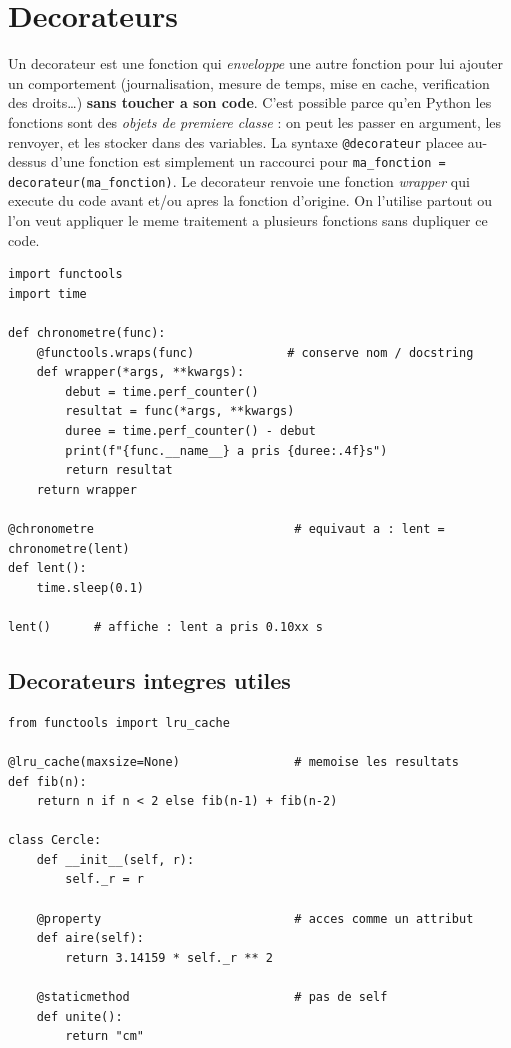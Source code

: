 \documentclass[11pt,a4paper]{article}
\begin{document}
\section{Decorateurs}
Un decorateur est une fonction qui \emph{enveloppe} une autre fonction pour lui
ajouter un comportement (journalisation, mesure de temps, mise en cache,
verification des droits\ldots) \textbf{sans toucher a son code}. C'est possible
parce qu'en Python les fonctions sont des \emph{objets de premiere classe} : on
peut les passer en argument, les renvoyer, et les stocker dans des variables. La
syntaxe \texttt{@decorateur} placee au-dessus d'une fonction est simplement un
raccourci pour \texttt{ma\_fonction = decorateur(ma\_fonction)}. Le decorateur
renvoie une fonction \emph{wrapper} qui execute du code avant et/ou apres la
fonction d'origine. On l'utilise partout ou l'on veut appliquer le meme
traitement a plusieurs fonctions sans dupliquer ce code.

\begin{lstlisting}
import functools
import time

def chronometre(func):
    @functools.wraps(func)             # conserve nom / docstring
    def wrapper(*args, **kwargs):
        debut = time.perf_counter()
        resultat = func(*args, **kwargs)
        duree = time.perf_counter() - debut
        print(f"{func.__name__} a pris {duree:.4f}s")
        return resultat
    return wrapper

@chronometre                            # equivaut a : lent = chronometre(lent)
def lent():
    time.sleep(0.1)

lent()      # affiche : lent a pris 0.10xx s
\end{lstlisting}

\subsection{Decorateurs integres utiles}
\begin{lstlisting}
from functools import lru_cache

@lru_cache(maxsize=None)                # memoise les resultats
def fib(n):
    return n if n < 2 else fib(n-1) + fib(n-2)

class Cercle:
    def __init__(self, r):
        self._r = r

    @property                           # acces comme un attribut
    def aire(self):
        return 3.14159 * self._r ** 2

    @staticmethod                       # pas de self
    def unite():
        return "cm"
\end{lstlisting}
\end{document}
